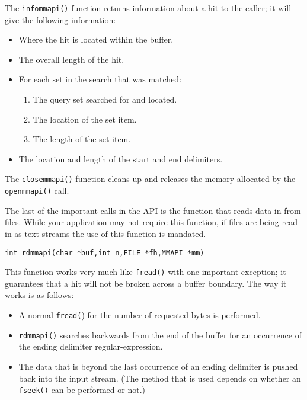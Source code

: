 The \verb`infommapi()` function returns information about a hit to the
caller; it will give the following information:
\begin{itemize}
 \item Where the hit is located within the buffer.
 \item The overall length of the hit.
 \item For each set in the search that was matched:
     \begin{enumerate}
     \item The query set searched for and located.
     \item The location of the set item.
     \item The length of the set item.
     \end{enumerate}
 \item The location and length of the start and end delimiters.
\end{itemize}

The \verb`closemmapi()` function cleans up and releases the memory
allocated by the \verb`openmmapi()` call.

The last of the important calls in the API is the function that
reads data in from files.  While your application may not require
this function, if files are being read in as text streams the use
of this function is mandated.

\begin{verbatim}
int rdmmapi(char *buf,int n,FILE *fh,MMAPI *mm)
\end{verbatim}

This function works very much like \verb`fread()` with one important
exception; it guarantees that a hit will not be broken across a
buffer boundary.  The way it works is as follows:
\begin{itemize}
\item A normal \verb`fread(`) for the number of requested bytes is performed.

\item \verb`rdmmapi()` searches backwards from the end of the buffer for an
occurrence of the ending delimiter regular-expression.

\item The data that is beyond the last occurrence of an ending
delimiter is pushed back into the input stream.  (The method
that is used depends on whether an \verb`fseek()` can be performed or
not.)
\end{itemize}

